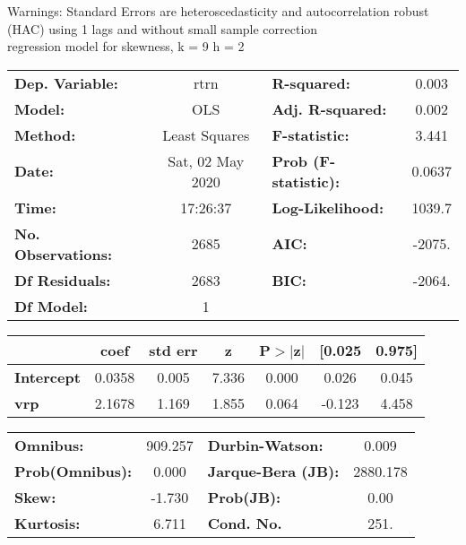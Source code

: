 Warnings: \newline
 [1] Standard Errors are heteroscedasticity and autocorrelation robust (HAC) using 1 lags and without small sample correction\\ 

regression model for skewness, k = 9 h = 2\begin{center}
\begin{tabular}{lclc}
\toprule
\textbf{Dep. Variable:}    &       rtrn       & \textbf{  R-squared:         } &     0.003   \\
\textbf{Model:}            &       OLS        & \textbf{  Adj. R-squared:    } &     0.002   \\
\textbf{Method:}           &  Least Squares   & \textbf{  F-statistic:       } &     3.441   \\
\textbf{Date:}             & Sat, 02 May 2020 & \textbf{  Prob (F-statistic):} &   0.0637    \\
\textbf{Time:}             &     17:26:37     & \textbf{  Log-Likelihood:    } &    1039.7   \\
\textbf{No. Observations:} &        2685      & \textbf{  AIC:               } &    -2075.   \\
\textbf{Df Residuals:}     &        2683      & \textbf{  BIC:               } &    -2064.   \\
\textbf{Df Model:}         &           1      & \textbf{                     } &             \\
\bottomrule
\end{tabular}
\begin{tabular}{lcccccc}
                   & \textbf{coef} & \textbf{std err} & \textbf{z} & \textbf{P$> |$z$|$} & \textbf{[0.025} & \textbf{0.975]}  \\
\midrule
\textbf{Intercept} &       0.0358  &        0.005     &     7.336  &         0.000        &        0.026    &        0.045     \\
\textbf{vrp}       &       2.1678  &        1.169     &     1.855  &         0.064        &       -0.123    &        4.458     \\
\bottomrule
\end{tabular}
\begin{tabular}{lclc}
\textbf{Omnibus:}       & 909.257 & \textbf{  Durbin-Watson:     } &    0.009  \\
\textbf{Prob(Omnibus):} &   0.000 & \textbf{  Jarque-Bera (JB):  } & 2880.178  \\
\textbf{Skew:}          &  -1.730 & \textbf{  Prob(JB):          } &     0.00  \\
\textbf{Kurtosis:}      &   6.711 & \textbf{  Cond. No.          } &     251.  \\
\bottomrule
\end{tabular}
\end{center}

